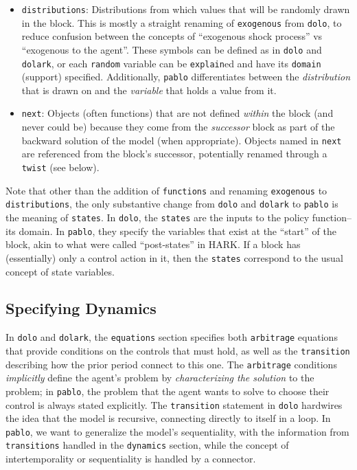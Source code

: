 \documentclass[12pt,pdftex,letterpaper]{article}
\begin{document}
\begin{itemize}
	\item \texttt{distributions}: Distributions from which values that will be randomly drawn in the block. This is mostly a straight renaming of \texttt{exogenous} from \texttt{dolo}, to reduce confusion between the concepts of ``exogenous shock process'' vs ``exogenous to the agent''. These symbols can be defined as in \texttt{dolo} and \texttt{dolark}, or each \texttt{random} variable can be \texttt{explain}ed and have its \texttt{domain} (support) specified. Additionally, \texttt{pablo} differentiates between the \textit{distribution} that is drawn on and the \textit{variable} that holds a value from it.
	
	\item \texttt{next}: Objects (often functions) that are not defined \textit{within} the block (and never could be) because they come from the \textit{successor} block as part of the backward solution of the model (when appropriate). Objects named in \texttt{next} are referenced from the block's successor, potentially renamed through a \texttt{twist} (see below).
\end{itemize}

Note that other than the addition of \texttt{functions} and renaming \texttt{exogenous} to \texttt{distributions}, the only substantive change from \texttt{dolo} and \texttt{dolark} to \texttt{pablo} is the meaning of \texttt{states}. In \texttt{dolo}, the \texttt{states} are the inputs to the policy function-- its domain. In \texttt{pablo}, they specify the variables that exist at the ``start'' of the block, akin to what were called ``post-states'' in HARK. If a block has (essentially) only a control action in it, then the \texttt{states} correspond to the usual concept of state variables.


\subsection{Specifying Dynamics}

In \texttt{dolo} and \texttt{dolark}, the \texttt{equations} section specifies both \texttt{arbitrage} equations that provide conditions on the controls that must hold, as well as the \texttt{transition} describing how the prior period connect to this one. The \texttt{arbitrage} conditions \textit{implicitly} define the agent's problem by \textit{characterizing the solution} to the problem; in \texttt{pablo}, the problem that the agent wants to solve to choose their control is always stated explicitly. The \texttt{transition} statement in \texttt{dolo} hardwires the idea that the model is recursive, connecting directly to itself in a loop. In \texttt{pablo}, we want to generalize the model's sequentiality, with the information from \texttt{transitions} handled in the \texttt{dynamics} section, while the concept of intertemporality or sequentiality is handled by a connector.
\end{document}
